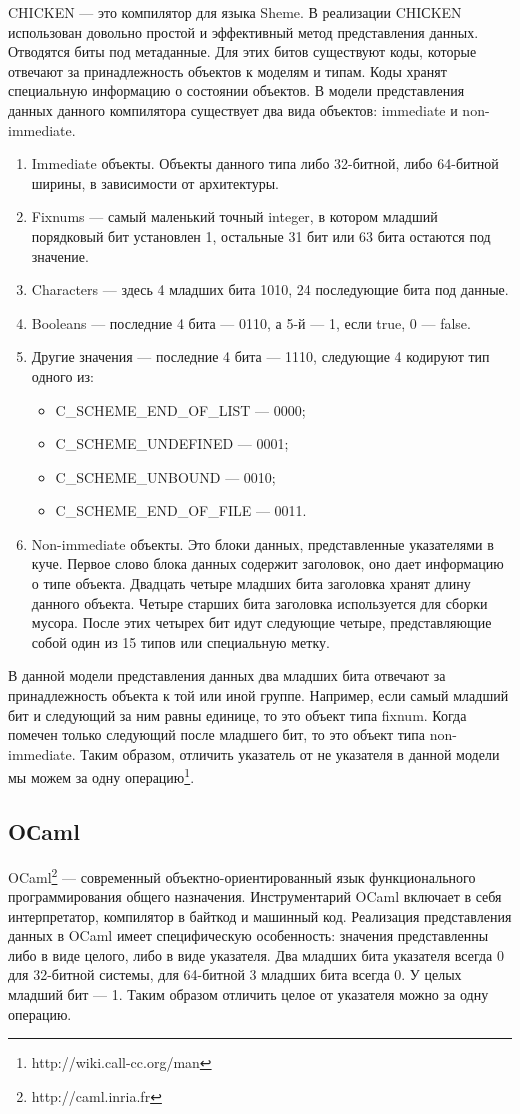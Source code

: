 CHICKEN — это компилятор для языка Sheme.
В реализации CHIСKEN использован довольно простой и эффективный метод представления данных.
Отводятся биты под метаданные. Для этих битов существуют коды, которые отвечают за
принадлежность объектов к моделям и типам. Коды хранят специальную информацию о состоянии объектов.
В  модели представления данных данного компилятора
существует два вида объектов: immediate и non-immediate.
\begin{enumerate}
\item Immediate объекты.
Объекты данного типа либо 32-битной, либо 64-битной ширины, в зависимости от архитектуры.
\item[1)] Fixnums — самый маленький точный integer, в котором младший порядковый бит 
установлен 1, остальные 31 бит или 63 бита остаются под значение.
\item[2)] Characters — здесь 4 младших бита 1010, 24 последующие бита под данные.
\item[3)] Booleans — последние 4 бита — 0110, а 5-й — 1, если true, 0 — false.
\item[4)] Другие значения — последние 4 бита — 1110, следующие 4 кодируют тип одного из:
\begin{itemize}
\item C\_SCHEME\_END\_OF\_LIST — 0000;
\item C\_SCHEME\_UNDEFINED — 0001;
\item C\_SCHEME\_UNBOUND — 0010;
\item C\_SCHEME\_END\_OF\_FILE — 0011.
\end{itemize}
\item Non-immediate объекты.
Это блоки данных, представленные указателями в куче.
Первое слово блока данных содержит заголовок, оно дает информацию о типе объекта. 
Двадцать четыре младших бита заголовка хранят длину данного объекта.
Четыре старших бита заголовка используется для сборки 
мусора.
После этих четырех бит идут следующие четыре, представляющие собой один из 15 типов или специальную метку.
\end{enumerate}
В данной модели представления данных два младших бита отвечают за принадлежность объекта к той или иной 
группе. Например, если самый младший бит и следующий за ним равны единице, то это объект типа fixnum.
Когда помечен только следующий после младшего бит, то это объект типа non-immediate.
Таким образом, отличить указатель от не указателя в данной модели мы можем за одну 
операцию\footnote{http://wiki.call-cc.org/man}.

\subsection {OСaml}
OCaml\footnote{http://caml.inria.fr} — современный объектно-ориентированный язык функционального программирования общего назначения. 
Инструментарий OCaml включает в себя интерпретатор, компилятор в байткод и машинный код.
Реализация представления данных в OCaml имеет специфическую особенность:
значения представленны либо в виде целого, либо в виде указателя.
Два младших бита указателя всегда 0 для 32-битной системы, для 64-битной 3 младших бита всегда 0. У целых младший бит — 1. 
Таким образом отличить целое от указателя можно за одну операцию.

